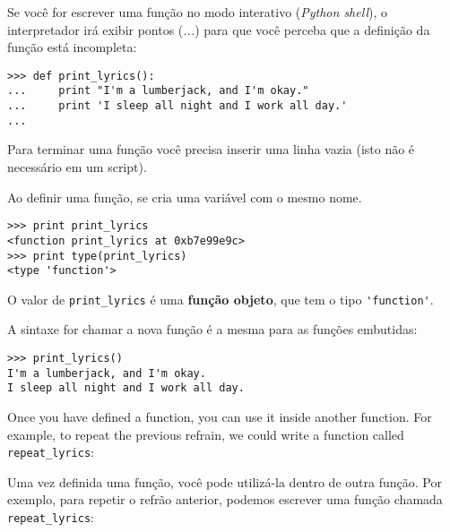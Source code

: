 

Se você for escrever uma função no modo interativo ({\it Python shell}), o
interpretador irá exibir pontos (\emph{...}) para que você perceba que a
definição da função está incompleta:

\beforeverb
\begin{verbatim}
>>> def print_lyrics():
...     print "I'm a lumberjack, and I'm okay."
...     print 'I sleep all night and I work all day.'
...
\end{verbatim}
\afterverb
%

%
Para terminar uma função você precisa inserir uma linha vazia (isto não é
necessário em um script).


Ao definir uma função, se cria uma variável com o mesmo nome.

\beforeverb
\begin{verbatim}
>>> print print_lyrics
<function print_lyrics at 0xb7e99e9c>
>>> print type(print_lyrics)
<type 'function'>
\end{verbatim}
\afterverb
%

%
O valor de \verb"print_lyrics" é uma {\bf função objeto}, que tem o tipo
\verb"'function'".



A sintaxe for chamar a nova função é a mesma para as funções
embutidas:

\beforeverb
\begin{verbatim}
>>> print_lyrics()
I'm a lumberjack, and I'm okay.
I sleep all night and I work all day.
\end{verbatim}
\afterverb
%
Once you have defined a function, you can use it inside another
function.  For example, to repeat the previous refrain, we could write
a function called \verb"repeat_lyrics":

%
Uma vez definida uma função, você pode utilizá-la dentro de outra função.
Por exemplo, para repetir o refrão anterior, podemos escrever uma função
chamada \verb"repeat_lyrics":

